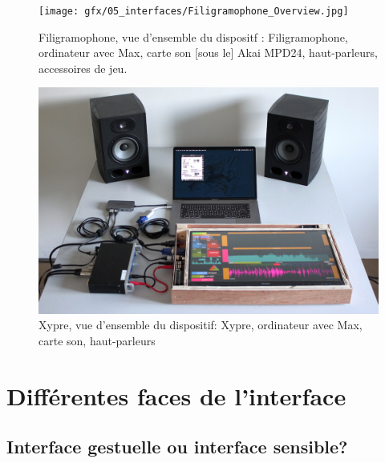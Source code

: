 \begin{figure}[!htbp]
	\captionsetup{format=plain}%
	\centering
	\begin{minipage}[t]{0.48\textwidth}
		\texttt{[image: gfx/05\_interfaces/Filigramophone\_Overview.jpg]}
		\caption[Filigramophone: vue d'ensemble]{Filigramophone, vue d'ensemble du dispositf : Filigramophone, ordinateur avec Max, carte son [sous le] Akai MPD24, haut-parleurs, accessoires de jeu.}
		\label{fig:interface:filigramophone_unplugged}
	\end{minipage}
	\hspace{.02\linewidth}
	\begin{minipage}[t]{0.48\textwidth}
	    \includegraphics[width=\linewidth]{gfx/05_interfaces/Xypre_Overview_144dpi.jpg}
		\caption[Xypre: vue d'ensemble]{Xypre, vue d'ensemble du dispositif: Xypre, ordinateur avec Max, carte son, haut-parleurs}
		\label{fig:interface:xypre_unplugged}
	\end{minipage}
\end{figure}

\section{Différentes faces de l'interface}

\subsection{Interface gestuelle ou interface sensible?}


